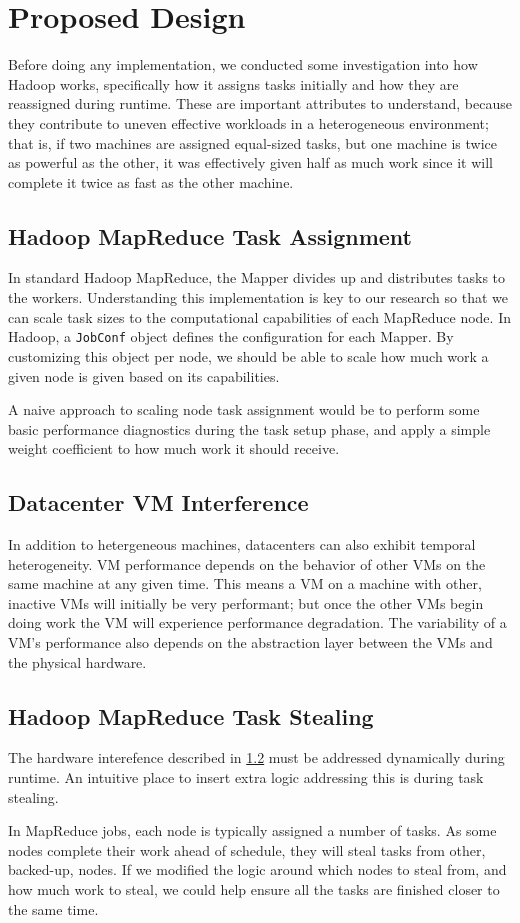 \section{Proposed Design}
\label{section:propeseddesign}

Before doing any implementation, we conducted some investigation into how Hadoop works, 
specifically how it assigns tasks initially and how they are reassigned during runtime.
These are important attributes to understand, because they contribute to uneven effective
workloads in a heterogeneous environment; that is, if two machines are assigned equal-sized
tasks, but one machine is twice as powerful as the other, it was effectively given half as
much work since it will complete it twice as fast as the other machine.

\subsection{Hadoop MapReduce Task Assignment}
In standard Hadoop MapReduce, the Mapper divides up and distributes tasks to the workers.
Understanding this implementation is key to our research so that we can scale task sizes
to the computational capabilities of each MapReduce node. In Hadoop, a \texttt{JobConf}
object defines the configuration for each Mapper. By customizing this object per node,
we should be able to scale how much work a given node is given based on its capabilities.

A naive approach to scaling node task assignment would be to perform some basic performance
diagnostics during the task setup phase, and apply a simple weight coefficient to how much
work it should receive.

\subsection{Datacenter VM Interference}
\label{sec:interference}
In addition to hetergeneous machines, datacenters can also exhibit temporal heterogeneity.
VM performance depends on the behavior of other VMs on the same machine at any given time.
This means a VM on a machine with other, inactive VMs will initially be very performant;
but once the other VMs begin doing work the VM will experience performance degradation.
The variability of a VM's performance also depends on the abstraction layer between the VMs
and the physical hardware.

\subsection{Hadoop MapReduce Task Stealing}
The hardware interefence described in \ref{sec:interference} must be addressed dynamically
during runtime. An intuitive place to insert extra logic addressing this is during task
stealing.

In MapReduce jobs, each node is typically assigned a number of tasks. As some nodes 
complete their work ahead of schedule, they will steal tasks from other, backed-up,
nodes. If we modified the logic around which nodes to steal from, and how much work
to steal, we could help ensure all the tasks are finished closer to the same time.

